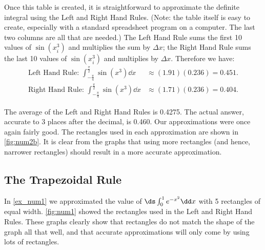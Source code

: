 \begin{example}
Once this table is created, it is straightforward to approximate the definite integral using the Left and Right Hand Rules. (Note: the table itself is easy to create, especially with a standard spreadsheet program on a computer. The last two columns are all that are needed.) The Left Hand Rule sums the first 10 values of $\sin(x_i^3)$ and multiplies the sum by $\Delta x$; the Right Hand Rule sums the last 10 values of $\sin(x_i^3)$ and multiplies by $\Delta x$. Therefore we have:
\begin{align*}
	\text{Left Hand Rule: }\int_{-\frac{\pi}4}^{\frac{\pi}2}\sin(x^3)\dd x
	& \approx (1.91)(0.236) = 0.451. \\
	\text{Right Hand Rule: }\int_{-\frac{\pi}4}^{\frac{\pi}2}\sin(x^3)\dd x
	&\approx (1.71)(0.236) = 0.404.
\end{align*}

The average of the Left and Right Hand Rules is 0.4275.  The actual answer, accurate to 3 places after the decimal, is 0.460. Our approximations were once again fairly good. The rectangles used in each approximation are shown in \autoref{fig:num2b}. It is clear from the graphs that using more rectangles (and hence, narrower rectangles) should result in a more accurate approximation.
\end{example}

\subsection{The Trapezoidal Rule}

In \autoref{ex_num1} we approximated the value of $\ds \int_0^1 e^{-x^2}\dd x$ with 5 rectangles of equal width. \autoref{fig:num1} showed the rectangles used in the Left and Right Hand Rules. These graphs clearly show that rectangles do not match the shape of the graph all that well, and that accurate approximations will only come by using lots of rectangles. 


